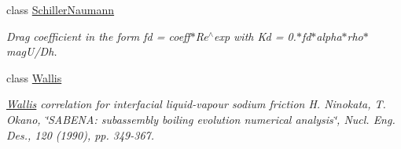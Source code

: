 \begin{DoxyCompactItemize}
class \hyperlink{classFoam_1_1FFDragCoefficientModels_1_1SchillerNaumann}{Schiller\+Naumann}
\begin{DoxyCompactList}\small\item\em Drag coefficient in the form fd = coeff$\ast$\+Re$^\wedge$exp with Kd = 0.$\ast$fd$\ast$alpha$\ast$rho$\ast$mag\+U/\+Dh. \end{DoxyCompactList}\item 
class \hyperlink{classFoam_1_1FFDragCoefficientModels_1_1Wallis}{Wallis}
\begin{DoxyCompactList}\small\item\em \hyperlink{classFoam_1_1FFDragCoefficientModels_1_1Wallis}{Wallis} correlation for interfacial liquid-\/vapour sodium friction H. Ninokata, T. Okano, \char`\"{}\+S\+A\+B\+E\+N\+A\+: subassembly boiling evolution numerical 
analysis\char`\"{}, Nucl. Eng. Des., 120 (1990), pp. 349-\/367. \end{DoxyCompactList}\end{DoxyCompactItemize}
